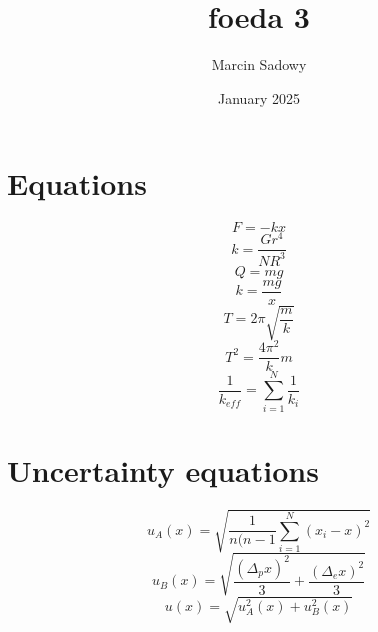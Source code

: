 \documentclass{article}
\title{foeda 3}
\author{Marcin Sadowy}
\date{January 2025}
\begin{document}
\maketitle

\section{Equations}
\begin{equation}
    F = -kx
\end{equation}
\begin{equation}
    k = \frac{Gr^4}{NR^3}
\end{equation}
\begin{equation}
    Q = mg
\end{equation}
\begin{equation}
    k = \frac{mg}{x}
\end{equation}
\begin{equation}
    T = 2 \pi \sqrt{\frac{m}{k}}
\end{equation}
\begin{equation}
    T^2 = \frac{4 \pi^2}{k}m
\end{equation}
\begin{equation}
    \frac{1}{k_{eff}} = \sum_{i=1}^N \frac{1}{k_i}
\end{equation}

\section{Uncertainty equations}
\begin{equation}
    u_A(x) = \sqrt{\frac{1}{n(n-1}\sum_{i=1}^N(x_i-x)^2}
\end{equation}
\begin{equation}
    u_B(x) = \sqrt{\frac{(\Delta_p x)^2}{3} + \frac{(\Delta_e x)^2}{3}}
\end{equation}
\begin{equation}
    u(x) = \sqrt{u_A^2(x) + u_B^2(x)}
\end{equation}
\end{document}
